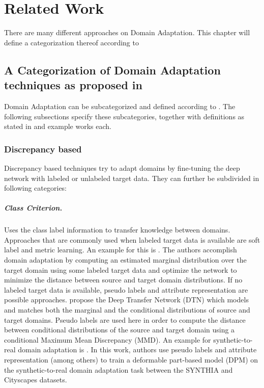 \chapter{Related Work}
\label{sec:related_work}
There are many different approaches on Domain Adaptation. This chapter will define a categorization thereof according to \cite{DBLP:journals/corr/Csurka17}

\section{A Categorization of Domain Adaptation techniques as proposed in \cite{DBLP:journals/corr/Csurka17}}
Domain Adaptation can be subcategorized and defined according to \cite{DBLP:journals/corr/Csurka17}. The following subsections specify these subcategories, together with definitions as stated in \cite{DBLP:journals/corr/abs-1802-03601} and example works each.

\subsection{Discrepancy based}
Discrepancy based techniques try to adapt domains by fine-tuning the deep network with labeled or unlabeled target data. They can further be subdivided in following categories:

\paragraph{Class Criterion.}
Uses the class label information to transfer knowledge between domains. Approaches that are commonly used when labeled target data is available are soft label and metric learning. An example for this is \cite{DBLP:journals/corr/TzengHDS15}. The authors accomplish domain adaptation by computing an estimated marginal distribution over the target domain using some labeled target data and optimize the network to minimize the distance between source and target domain distributions. If no labeled target data is available, pseudo labels and attribute representation are possible approaches. \cite{DBLP:journals/corr/ZhangYCW15} propose the Deep Transfer Network (DTN) which models and matches both the marginal and the conditional distributions of source and target domains. Pseudo labels are used here in order to compute the distance between conditional distributions of the source and target domain using a conditional Maximum Mean Discrepancy (MMD). An example for synthetic-to-real domain adaptation is \cite{DBLP:journals/corr/LopezXGVR16}. In this work, authors use pseudo labels and attribute representation (among others) to train a deformable part-based model (DPM) on the synthetic-to-real domain adaptation task between the SYNTHIA \cite{RosCVPR16} and Cityscapes \cite{Cordts_2016_CVPR} datasets.


